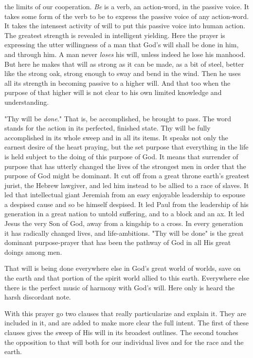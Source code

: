 the limits of our cooperation. \textit{Be} is a verb, an action-word, in the
passive voice. It takes some form of the verb to be to express the
passive voice of any action-word. It takes the intensest activity of will
to put this passive voice into human action. The greatest strength is
revealed in intelligent yielding. Here the prayer is expressing the utter
willingness of a man that God's will shall be done in him, and through
him. A man never \textit{loses} his will, unless indeed he lose his manhood. But
here he makes that will as strong as it can be made, as a bit of steel,
better like the strong oak, strong enough to sway and bend in the wind.
Then he uses all its strength in becoming passive to a higher will. And
that too when the purpose of that higher will is not clear to his own
limited knowledge and understanding.

"Thy will be \textit{done}." That is, be accomplished, be brought to pass. The
word stands for the action in its perfected, finished state. Thy will be
fully accomplished in its whole sweep and in all its items. It speaks not
only the earnest desire of the heart praying, but the set purpose that
everything in the life is held subject to the doing of this purpose of
God. It means that surrender of purpose that has utterly changed the lives
of the strongest men in order that the purpose of God might be dominant.
It cut off from a great throne earth's greatest jurist, the Hebrew
lawgiver, and led him instead to be allied to a race of slaves. It led
that intellectual giant Jeremiah from an easy enjoyable leadership to
espouse a despised cause and so be himself despised. It led Paul from the
leadership of his generation in a great nation to untold suffering, and to
a block and an ax. It led Jesus the very Son of God, away from a kingship
to a cross. In every generation it has radically changed lives, and
life-ambitions. "Thy will be done" is the great dominant purpose-prayer
that has been the pathway of God in all His great doings among men.

That will is being done everywhere else in God's great world of worlds,
save on the earth and that portion of the spirit world allied to this
earth. Everywhere else there is the perfect music of harmony with God's
will. Here only is heard the harsh discordant note.

With this prayer go two clauses that really particularize and explain it.
They are included in it, and are added to make more clear the full intent.
The first of these clauses gives the sweep of His will in its broadest
outlines. The second touches the opposition to that will both for our
individual lives and for the race and the earth.


